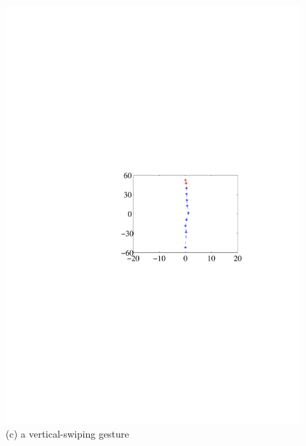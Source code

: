 \begin{figure}[!t]
{\begin{minipage}[t]{0.19\textwidth}
            \includegraphics[width=\textwidth]{fig/gesture-distinction3.pdf}\\
            \centering \footnotesize (c) a vertical-swiping gesture
            \end{minipage}
        }
        \hspace{0.25cm}
\end{figure}
